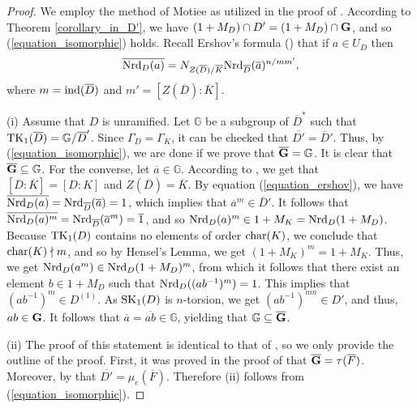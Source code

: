 \documentclass{amsart}
\theoremstyle{definition}
\numberwithin{equation}{section} %
\begin{document}
\begin{proof}
	We employ the method of Motiee as utilized in the proof of \cite[Theorem 10]{motiee-13}. According to Theorem \ref{corollary_in_D'}, we have $(1+M_D)\cap D'=(1+M_D)\cap {\bf G}$, and so (\ref{equation_isomorphic}) holds. Recall Ershov's formula (\cite[Corollary 2]{ershow-82}) that if $a\in U_D$ then
	\begin{equation}\label{equation_ershov}
	\overline{{\rm Nrd}_D(a)}=N_{Z(\overline{D})/\overline{K}}{\rm Nrd}_{\overline{D}}(\overline{a})^{n/{mm'}},
\end{equation}
	where $m={\rm ind}(\overline{D})$ and $m'=[Z(\overline{D}):\overline{K}]$.
	
	(i) Assume that $D$ is unramified. Let $\mathbb{G}$ be a subgroup of $\overline{D}^*$ such that ${\rm TK}_1(\overline{D})=\mathbb{G}/\overline{D}'$. Since $\Gamma_D=\Gamma_K$, it can be checked that $\overline{D'}=\overline{D}'$. Thus, by (\ref{equation_isomorphic}), we are done if we prove that $\overline{\bf G}=\mathbb{G}$. It is clear that $\overline{\bf G}\subseteq \mathbb{G}$.  For the converse, let $\overline{a}\in \mathbb{G}$. According to \cite[Theorem 3.2]{wad-2002}, we get that $[\overline{D}:\overline{K}]=[D:K]$ and $Z(\overline{D})=\overline{K}$. By equation (\ref{equation_ershov}), we have $\overline{{\rm Nrd}_D(a)}={\rm Nrd}_{\overline{D}}(\overline{a})=1$, which implies that $\overline{a}^m\in\overline{D}'$. It follows that $\overline{{\rm Nrd}_D(a)^m}={\rm Nrd}_{\overline{D}}(\overline{a}^m)=\overline{1}$, and so ${\rm Nrd}_D(a)^m\in 1+M_K={\rm Nrd}_D(1+M_D)$. Because ${\rm TK}_1(D)$ contains no elements of order ${\rm char}(K)$, we conclude that ${\rm char}(K)\nmid m$, and so by Hensel's Lemma, we get $ (1+M_K)^m= 1+M_K$. Thus, we get ${\rm Nrd}_D(a^m)\in {\rm Nrd}_D(1+M_D)^m$, from which it follows that there exist an element $b\in 1+M_D$ such that ${\rm Nrd}_D((ab^{-1})^m)=1$. This implies that $(ab^{-1})^m\in D^{(1)}$. As ${\rm SK}_1(D)$ is $n$-torsion, we get $(ab^{-1})^{mn}\in D'$, and thus, $ab\in{\bf G}$. It follows that $\overline{a}=\overline{ab}\in\mathbb{G}$, yielding that $\mathbb{G}\subseteq \overline{{\bf G}}$.
	
	(ii) The proof of this statement is identical to that of \cite[Theorem 10 (ii)]{motiee-13}, so we only provide the outline of the proof. First, it was proved in the proof of \cite[Theorem 10 (ii)]{motiee-13} that $\overline{{\bf G}}=\tau(\overline{F})$. Moreover, by \cite[Propostion 2.1]{hwang-wadsworth-99} that $\overline{D'}=\mu_e(\overline{F})$. Therefore (ii) follows from (\ref{equation_isomorphic}).
\end{proof}
\end{document}

